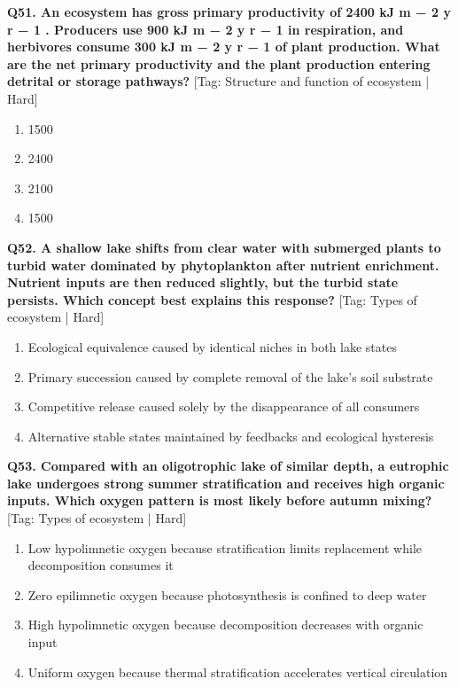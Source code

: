 \noindent\textbf{Q51. An ecosystem has gross primary productivity of 2400 kJ m − 2 y r − 1 . Producers use 900 kJ m − 2 y r − 1 in respiration, and herbivores consume 300 kJ m − 2 y r − 1 of plant production. What are the net primary productivity and the plant production entering detrital or storage pathways?} \hfill [Tag: Structure and function of ecosystem | Hard]
\begin{enumerate}[label=(\alph*),topsep=2pt,itemsep=1pt,partopsep=0pt,parsep=0pt]
    \item {1500}
    \item {2400}
    \item {2100}
    \item {1500}
\end{enumerate}
\vspace{2mm}

\noindent\textbf{Q52. A shallow lake shifts from clear water with submerged plants to turbid water dominated by phytoplankton after nutrient enrichment. Nutrient inputs are then reduced slightly, but the turbid state persists. Which concept best explains this response?} \hfill [Tag: Types of ecosystem | Hard]
\begin{enumerate}[label=(\alph*),topsep=2pt,itemsep=1pt,partopsep=0pt,parsep=0pt]
    \item {Ecological equivalence caused by identical niches in both lake states}
    \item {Primary succession caused by complete removal of the lake's soil substrate}
    \item {Competitive release caused solely by the disappearance of all consumers}
    \item {Alternative stable states maintained by feedbacks and ecological hysteresis}
\end{enumerate}
\vspace{2mm}

\noindent\textbf{Q53. Compared with an oligotrophic lake of similar depth, a eutrophic lake undergoes strong summer stratification and receives high organic inputs. Which oxygen pattern is most likely before autumn mixing?} \hfill [Tag: Types of ecosystem | Hard]
\begin{enumerate}[label=(\alph*),topsep=2pt,itemsep=1pt,partopsep=0pt,parsep=0pt]
    \item {Low hypolimnetic oxygen because stratification limits replacement while decomposition consumes it}
    \item {Zero epilimnetic oxygen because photosynthesis is confined to deep water}
    \item {High hypolimnetic oxygen because decomposition decreases with organic input}
    \item {Uniform oxygen because thermal stratification accelerates vertical circulation}
\end{enumerate}
\vspace{2mm}

